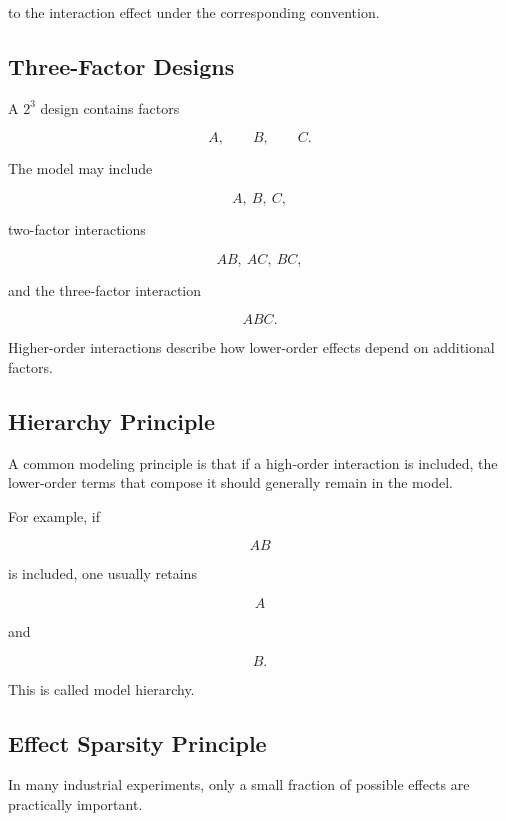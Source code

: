 to the interaction effect under the corresponding convention.

\subsection{Three-Factor Designs}
\label{subsec:three-factor-designs}

A \(2^3\) design contains factors

\[
A,
\qquad
B,
\qquad
C.
\]

The model may include

\[
\boxed{
A,\ B,\ C,
}
\]

two-factor interactions

\[
\boxed{
AB,\ AC,\ BC,
}
\]

and the three-factor interaction

\[
\boxed{
ABC.
}
\]

Higher-order interactions describe how lower-order effects depend on
additional factors.

\subsection{Hierarchy Principle}
\label{subsec:hierarchy-principle}

A common modeling principle is that if a high-order interaction is
included, the lower-order terms that compose it should generally remain
in the model.

For example, if

\[
AB
\]

is included, one usually retains

\[
A
\]

and

\[
B.
\]

This is called model hierarchy.

\subsection{Effect Sparsity Principle}
\label{subsec:effect-sparsity}

In many industrial experiments, only a small fraction of possible
effects are practically important.

